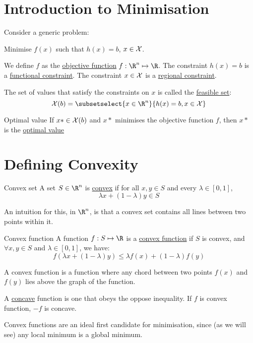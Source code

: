 \documentclass[../Main.tex]{subfiles}
\begin{document}
\section{Introduction to Minimisation}
Consider a generic problem:

Minimise $f(x)$ such that $h(x) = b$, $x \in \mathcal{X}$.

We define $f$ as the \underline{objective function} $f : \R^n \mapsto \R$. The constraint $h(x) = b$ is a \underline{functional constraint}. The constraint $x \in \mathcal{X}$ is a \underline{regional constraint}.

The set of values that satisfy the constraints on $x$ is called the \underline{feasible set}:
\begin{equation}
    \Xset(b) = \subsetselect{x \in \R^n}{h(x) = b, x \in \Xset}
    \label{eqnFeasibleSet}
\end{equation}
\begin{definition}{Optimal value}
    If $x* \in \mathcal{X}(b)$ and $x*$ minimises the objective function $f$, then $x*$ is the \underline{optimal value}
\end{definition}
\section{Defining Convexity}
\begin{definition}{Convex set}
    A set $S \in \R^n$ is \underline{convex} if for all $x, y \in S$ and every $\lambda \in [0, 1]$,
    \begin{equation*}
        \lambda x + (1 - \lambda) y \in S
    \end{equation*}
\end{definition}
\begin{remark}
    An intuition for this, in $\R^n$, is that a convex set contains all lines between two points within it.
\end{remark}
\begin{definition}{Convex function}
    A function $f : S \mapsto \R$ is a \underline{convex function} if $S$ is convex, and $\forall x, y \in S$ and $\lambda \in [0, 1]$, we have:
    \begin{equation*}
        f(\lambda x + (1-\lambda)y) \leq \lambda f(x) + (1 - \lambda) f(y)
    \end{equation*}
\end{definition}
\begin{remarks}
    \item A convex function is a function where any chord between two points $f(x)$ and $f(y)$ lies above the graph of the function.
    \item A \underline{concave} function is one that obeys the oppose inequality. If $f$ is convex function, $-f$ is concave.
    \item Convex functions are an ideal first candidate for minimisation, since (as we will see) any local minimum is a global minimum.
\end{remarks}
\end{document}
